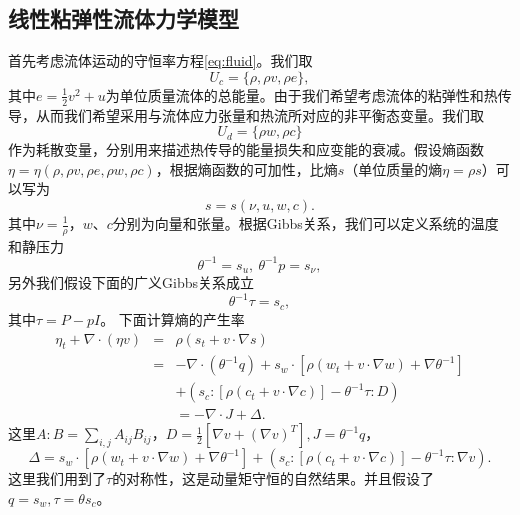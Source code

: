 	\subsection{线性粘弹性流体力学模型}
	首先考虑流体运动的守恒率方程\eqref{eq:fluid}。我们取
	\begin{equation*}
		U_c = \{\rho, \rho v, \rho e\},
	\end{equation*}
	其中$e = \frac{1}{2} v^2 + u$为单位质量流体的总能量。由于我们希望考虑流体的粘弹性和热传导，从而我们希望采用与流体应力张量和热流所对应的非平衡态变量。我们取
	\begin{equation*}
		U_d = \{ \rho w,\rho c\}
	\end{equation*}
	作为耗散变量，分别用来描述热传导的能量损失和应变能的衰减。假设熵函数$\eta = \eta (\rho,\rho v ,\rho e, \rho w, \rho c)$，根据熵函数的可加性，比熵$s$（单位质量的熵$\eta = \rho s$）可以写为
	\begin{equation*}
		s = s(\nu, u, w, c).
	\end{equation*}
	其中$\nu = \frac{1}{\rho}$，$w$、$c$分别为向量和张量。根据Gibbs关系，我们可以定义系统的温度和静压力
	\begin{equation*}
		\theta^{-1} = s_u,\ \theta^{-1} p = s_{\nu},
	\end{equation*}
	另外我们假设下面的广义Gibbs关系成立
	\begin{equation*}
		\theta^{-1} \tau = s_c,
	\end{equation*}
	其中$\tau = P - pI$。%
    下面计算熵的产生率
	\begin{eqnarray*}
		\eta_t + \nabla \cdot (\eta v) &=& \rho (s_t + v \cdot \nabla s) \\
		&=& -\nabla \cdot (\theta^{-1} q) + s_w \cdot [\rho (w_t + v \cdot \nabla w) + \nabla \theta^{-1}] \\
		&&+ (s_c:[\rho (c_t + v \cdot \nabla c)] - \theta^{-1} \tau : D) \\
		&& = -\nabla \cdot J + \Delta.
	\end{eqnarray*}
	这里$A:B = \sum_{i,j}A_{ij}B_{ij}$，$D = \frac{1}{2} [\nabla v + (\nabla v)^T], J =\theta^{-1} q $，
	\begin{equation*}
		\Delta = s_w \cdot [\rho (w_t + v \cdot \nabla w) + \nabla \theta^{-1}] + (s_c:[\rho (c_t + v \cdot \nabla c)] - \theta^{-1} \tau : \nabla v) .
	\end{equation*}
	这里我们用到了$\tau$的对称性，这是动量矩守恒的自然结果\cite{dimitrienko2010nonlinear}。并且假设了$q =s_w,\tau = \theta s_c$。

